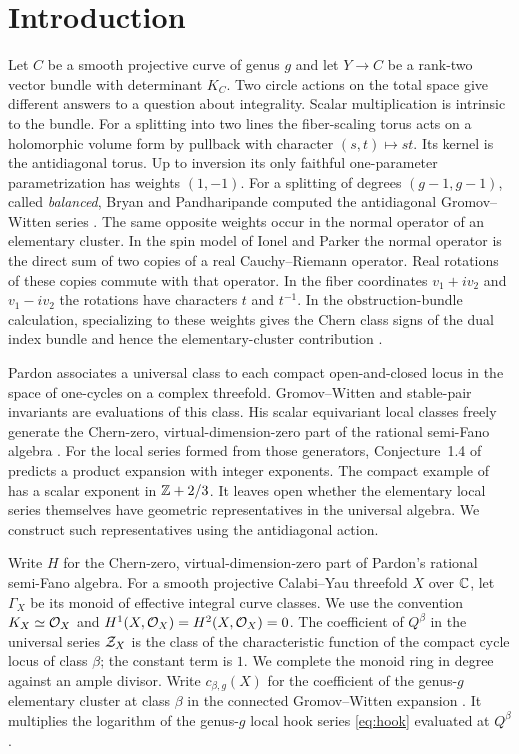 \section{Introduction}

Let $C$ be a smooth projective curve of genus $g$ and let $Y\to C$ be
a rank-two vector bundle with determinant $K_C$. Two circle actions
on the total space give different answers to a question about
integrality. Scalar multiplication is intrinsic to the bundle.
For a splitting into two lines the fiber-scaling torus acts on a
holomorphic volume form by pullback with character $(s,t)\mapsto st$.
Its kernel is the antidiagonal torus. Up to inversion its only faithful
one-parameter parametrization has weights $(1,-1)$. For a splitting of degrees
$(g-1,g-1)$, called \emph{balanced}, Bryan and Pandharipande computed
the antidiagonal Gromov--Witten series \cite[Corollary~7.3]{BP}.
The same opposite weights occur in the normal operator of an elementary
cluster. In the spin model of Ionel and Parker the normal operator
is the direct sum of two copies of a real Cauchy--Riemann operator.
Real rotations of these copies commute with that operator. In the
fiber coordinates $v_1+i v_2$ and $v_1-i v_2$ the rotations have
characters $t$ and $t^{-1}$. In the obstruction-bundle calculation,
specializing to these weights gives the Chern class signs of the dual
index bundle and hence the elementary-cluster contribution
\cite[Propositions~3.2--3.3, (3.2)--(3.3)]{IP}.

Pardon associates a universal class to each compact open-and-closed
locus in the space of one-cycles on a complex threefold.
Gromov--Witten and stable-pair invariants
are evaluations of this class. His scalar equivariant local classes
freely generate the Chern-zero, virtual-dimension-zero part of the
rational semi-Fano algebra \cite[Theorem~1.2]{Pardon}. For the local
series formed from those generators, Conjecture~1.4 of \cite{Pardon}
predicts a product expansion with integer exponents. The compact
example of \cite{Counterexample} has a scalar exponent in
$\mathbb Z+2/3$. It leaves open whether the elementary local series
themselves have geometric representatives in the universal algebra.
We construct such representatives using the antidiagonal action.

Write $H$ for the Chern-zero, virtual-dimension-zero part of
Pardon's rational semi-Fano algebra. For a smooth projective
Calabi--Yau threefold $X$ over $\mathbb C$, let $\Gamma_X$ be its monoid of
effective integral curve classes. We use the convention
$K_X\simeq\mathcal O_X$ and $H^1(X,\mathcal O_X)=H^2(X,\mathcal O_X)=0$.
The coefficient of $Q^\beta$ in the universal series $\mathcal Z_X$ is the
class of the characteristic function of the compact cycle locus of
class $\beta$; the constant term is $1$.
We complete the monoid ring in degree against an ample divisor.
Write $c_{\beta,g}(X)$ for the coefficient of the genus-$g$
elementary cluster at class $\beta$ in the connected Gromov--Witten
expansion \cite[Theorem~8.1]{IP}. It multiplies the logarithm of
the genus-$g$ local hook series \eqref{eq:hook} evaluated at $Q^\beta$.

